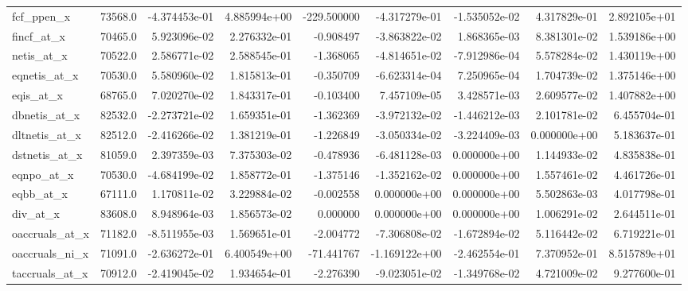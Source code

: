 \documentclass[10pt]{article}
\begin{document}
\begin{landscape}
\begin{longtable}{lrrrrrrrr}
fcf\_ppen\_x              &   73568.0 & -4.374453e-01 &  4.885994e+00 &   -229.500000 & -4.317279e-01 & -1.535052e-02 &  4.317829e-01 &  2.892105e+01 \\
fincf\_at\_x              &   70465.0 &  5.923096e-02 &  2.276332e-01 &     -0.908497 & -3.863822e-02 &  1.868365e-03 &  8.381301e-02 &  1.539186e+00 \\
netis\_at\_x              &   70522.0 &  2.586771e-02 &  2.588545e-01 &     -1.368065 & -4.814651e-02 & -7.912986e-04 &  5.578284e-02 &  1.430119e+00 \\
eqnetis\_at\_x            &   70530.0 &  5.580960e-02 &  1.815813e-01 &     -0.350709 & -6.623314e-04 &  7.250965e-04 &  1.704739e-02 &  1.375146e+00 \\
eqis\_at\_x               &   68765.0 &  7.020270e-02 &  1.843317e-01 &     -0.103400 &  7.457109e-05 &  3.428571e-03 &  2.609577e-02 &  1.407882e+00 \\
dbnetis\_at\_x            &   82532.0 & -2.273721e-02 &  1.659351e-01 &     -1.362369 & -3.972132e-02 & -1.446212e-03 &  2.101781e-02 &  6.455704e-01 \\
dltnetis\_at\_x           &   82512.0 & -2.416266e-02 &  1.381219e-01 &     -1.226849 & -3.050334e-02 & -3.224409e-03 &  0.000000e+00 &  5.183637e-01 \\
dstnetis\_at\_x           &   81059.0 &  2.397359e-03 &  7.375303e-02 &     -0.478936 & -6.481128e-03 &  0.000000e+00 &  1.144933e-02 &  4.835838e-01 \\
eqnpo\_at\_x              &   70530.0 & -4.684199e-02 &  1.858772e-01 &     -1.375146 & -1.352162e-02 &  0.000000e+00 &  1.557461e-02 &  4.461726e-01 \\
eqbb\_at\_x               &   67111.0 &  1.170811e-02 &  3.229884e-02 &     -0.002558 &  0.000000e+00 &  0.000000e+00 &  5.502863e-03 &  4.017798e-01 \\
div\_at\_x                &   83608.0 &  8.948964e-03 &  1.856573e-02 &      0.000000 &  0.000000e+00 &  0.000000e+00 &  1.006291e-02 &  2.644511e-01 \\
oaccruals\_at\_x          &   71182.0 & -8.511955e-03 &  1.569651e-01 &     -2.004772 & -7.306808e-02 & -1.672894e-02 &  5.116442e-02 &  6.719221e-01 \\
oaccruals\_ni\_x          &   71091.0 & -2.636272e-01 &  6.400549e+00 &    -71.441767 & -1.169122e+00 & -2.462554e-01 &  7.370952e-01 &  8.515789e+01 \\
taccruals\_at\_x          &   70912.0 & -2.419045e-02 &  1.934654e-01 &     -2.276390 & -9.023051e-02 & -1.349768e-02 &  4.721009e-02 &  9.277600e-01 \\

\end{longtable}
\end{landscape}
\end{document}
